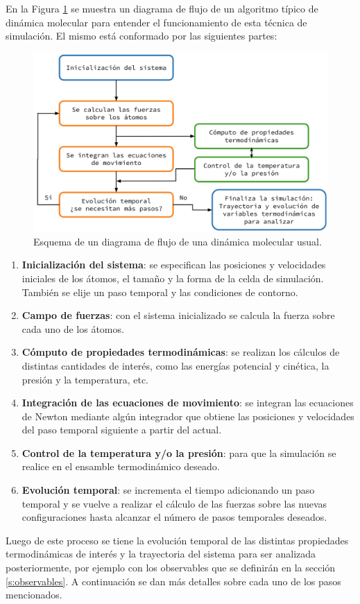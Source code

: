 En la Figura \ref{fig:esquema_md} se muestra un diagrama de flujo de un algoritmo
típico de dinámica molecular para entender el funcionamiento de esta técnica de 
simulación. El mismo está conformado por las siguientes partes:
\begin{figure}[h!]
    \centering
    \includegraphics[width=.8\textwidth]{Metodos/atomicos/esquema.png}
    \caption{Esquema de un diagrama de flujo de una dinámica molecular usual.}
    \label{fig:esquema_md}
\end{figure}
\begin{enumerate}
    \item \textbf{Inicialización del sistema}: se especifican las posiciones y
        velocidades iniciales de los átomos, el tamaño y la forma de la celda de 
        simulación. También se elije un paso temporal y las condiciones de 
        contorno.
    \item \textbf{Campo de fuerzas}: con el sistema inicializado se calcula la 
        fuerza sobre cada uno de los átomos.
    \item \textbf{Cómputo de propiedades termodinámicas}: se realizan los
        cálculos de distintas cantidades de interés, como las energías potencial
        y cinética, la presión y la temperatura, etc.
    \item \textbf{Integración de las ecuaciones de movimiento}: se integran las
        ecuaciones de Newton mediante algún integrador que obtiene las posiciones
        y velocidades del paso temporal siguiente a partir del actual.
    \item \textbf{Control de la temperatura y/o la presión}: para que la 
        simulación se realice en el ensamble termodinámico deseado.
    \item \textbf{Evolución temporal}: se incrementa el tiempo adicionando un
        paso temporal y se vuelve a realizar el cálculo de las fuerzas sobre las 
        nuevas configuraciones hasta alcanzar el número de pasos temporales 
        deseados.
\end{enumerate}
Luego de este proceso se tiene la evolución temporal de las distintas propiedades
termodinámicas de interés y la trayectoria del sistema para ser analizada 
posteriormente, por ejemplo con los observables que se definirán en la sección 
\ref{s:observables}. A continuación se dan más detalles sobre cada uno de los 
pasos mencionados.


